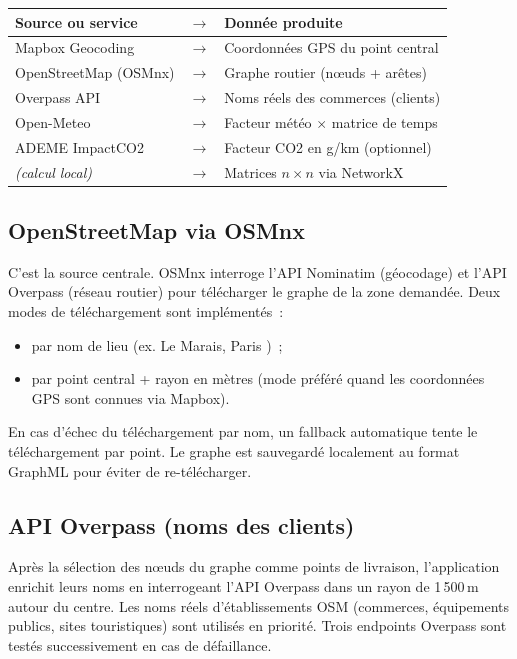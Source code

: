 \documentclass[a4paper, 12pt, twoside]{article}
\begin{document}
\begin{center}
\begin{tabular}{lcl}
  \textbf{Source ou service} & $\rightarrow$ & \textbf{Donn\'{e}e produite} \\
  \hline
  Mapbox Geocoding & $\rightarrow$ & Coordonn\'{e}es GPS du point central \\
  OpenStreetMap (OSMnx) & $\rightarrow$ & Graphe routier (n\oe uds + ar\^{e}tes) \\
  Overpass API & $\rightarrow$ & Noms r\'{e}els des commerces (clients) \\
  Open-Meteo & $\rightarrow$ & Facteur m\'{e}t\'{e}o $\times$ matrice de temps \\
  ADEME ImpactCO2 & $\rightarrow$ & Facteur CO2 en g/km (optionnel) \\
  \textit{(calcul local)} & $\rightarrow$ & Matrices $n \times n$ via NetworkX \\
  \hline
\end{tabular}
\end{center}

\subsection{OpenStreetMap via OSMnx}

C'est la source centrale. OSMnx interroge l'API Nominatim (g\'{e}ocodage) et l'API Overpass
(r\'{e}seau routier) pour t\'{e}l\'{e}charger le graphe de la zone demand\'{e}e. Deux modes de
t\'{e}l\'{e}chargement sont impl\'{e}ment\'{e}s~:
\begin{itemize}
  \item par nom de lieu (ex. \og Le Marais, Paris \fg{})~;
  \item par point central + rayon en m\`{e}tres (mode pr\'{e}f\'{e}r\'{e} quand les coordonn\'{e}es
        GPS sont connues via Mapbox).
\end{itemize}
En cas d'\'{e}chec du t\'{e}l\'{e}chargement par nom, un fallback automatique tente le t\'{e}l\'{e}chargement
par point. Le graphe est sauvegard\'{e} localement au format GraphML pour \'{e}viter de re-t\'{e}l\'{e}charger.

\subsection{API Overpass (noms des clients)}

Apr\`{e}s la s\'{e}lection des n\oe uds du graphe comme points de livraison, l'application enrichit
leurs noms en interrogeant l'API Overpass dans un rayon de 1\,500\,m autour du centre. Les noms
r\'{e}els d'\'{e}tablissements OSM (commerces, \'{e}quipements publics, sites touristiques) sont
utilis\'{e}s en priorit\'{e}. Trois endpoints Overpass sont test\'{e}s successivement en cas de
d\'{e}faillance.
\end{document}
